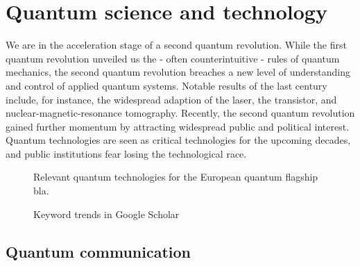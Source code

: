 \section{Quantum science and technology}

We are in the acceleration stage of a second quantum revolution.
While the first quantum revolution unveiled us the - often counterintuitive - rules of quantum mechanics, the second quantum revolution breaches a new level of understanding and control of applied quantum systems.
Notable results of the last century include, for instance, the widespread adaption of the laser, the transistor, and nuclear-magnetic-resonance tomography.
Recently, the second quantum revolution gained further momentum by attracting widespread public and political interest.
Quantum technologies are seen as critical technologies for the upcoming decades, and public institutions fear losing the technological race.


\begin{figure}[htb]
	\centering
	
	\caption{Relevant quantum technologies for the European quantum flagship bla.}
\end{figure}

\begin{figure}[htb]
	\centering
	
	\caption{Keyword trends in Google Scholar}
\end{figure}

\subsection{Quantum communication}


